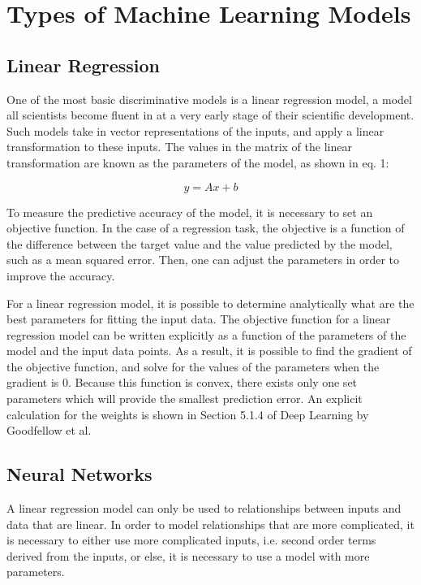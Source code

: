 \section{Types of Machine Learning Models} 

\subsection{Linear Regression}

One of the most basic discriminative models is a linear regression model, a model all scientists become fluent in at a very early stage of their scientific development. Such models take in vector representations of the inputs, and apply a linear transformation to these inputs. The values in the matrix of the linear transformation are known as the parameters of the model, as shown in eq. 1:

\begin{equation}
  y = Ax + b
\end{equation}

To measure the predictive accuracy of the model, it is necessary to set an objective function. In the case of a regression task, the objective is a function of the difference between the target value and the value predicted by the model, such as a mean squared error. Then, one can adjust the parameters in order to improve the accuracy.

For a linear regression model, it is possible to determine analytically what are the best parameters for fitting the input data. The objective function for a linear regression model can be written explicitly as a function of the parameters of the model and the input data points. As a result, it is possible to find the gradient of the objective function, and solve for the values of the parameters when the gradient is 0. Because this function is convex, there exists only one set parameters which will provide the smallest prediction error. An explicit calculation for the weights is shown in Section 5.1.4 of Deep Learning by Goodfellow et al\cite{Goodfellow-et-al-2016}.

\subsection{Neural Networks}

A linear regression model can only be used to relationships between inputs and data that are linear. In order to model relationships that are more complicated, it is necessary to either use more complicated inputs, i.e. second order terms derived from the inputs, or else, it is necessary to use a model with more parameters.

